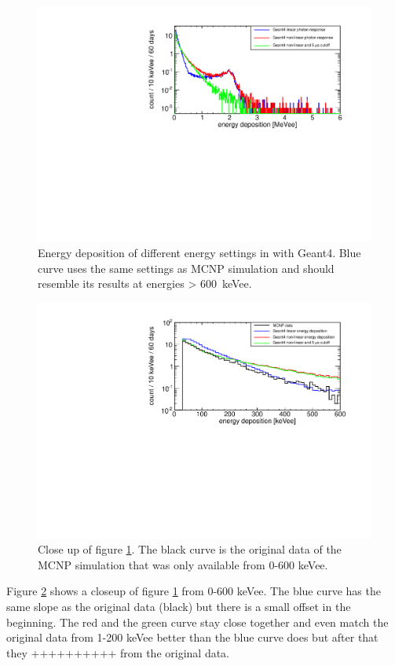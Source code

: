 \documentclass[12pt]{article}
\begin{document}
 \begin{figure}[H]
 	\centering
 		\includegraphics[width=1.\textwidth]{pics/edep_full.pdf}
 		\caption{Energy deposition of different energy settings in with Geant4. Blue curve uses the same settings as MCNP simulation and should resemble its results at energies > \SI{600}{keVee}.}
 		\label{fig:edepFull}
\end{figure}
\begin{figure}[H]
	\centering
 		\includegraphics[width=1.\textwidth]{pics/edep_small.pdf}
 		\caption{Close up of figure \ref{fig:edepFull}. The black curve is the original data of the MCNP simulation that was only available from {0-600} {keVee}.}
 		\label{fig:edepSmall}
 	\end{figure} 
 	
 Figure \ref{fig:edepSmall} shows a closeup of figure \ref{fig:edepFull} from 0-600 keVee. The blue curve has the same slope as the original data (black) but there is a small offset in the beginning.
 The red and the green curve stay close together and even match the original data from 1-200 keVee better than the blue curve does but after that they ++++++++++ from the original data.
 
\end{document}
